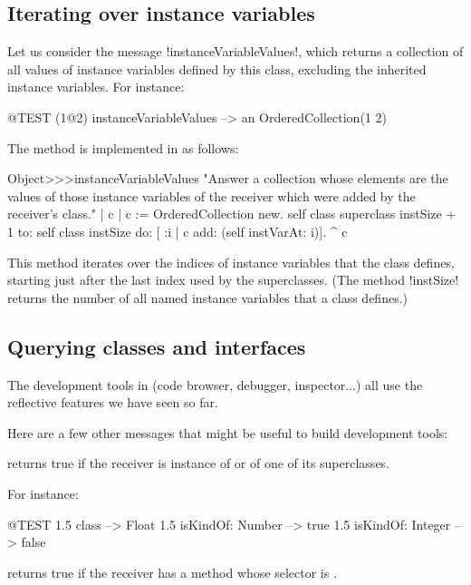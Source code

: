 \documentclass[a4paper,10pt,twoside]{book}
\begin{document}
\subsection{Iterating over instance variables}

Let us consider the message \ct!instanceVariableValues!, which returns a collection of all values of instance variables defined by this class, excluding the inherited instance variables.
For instance:
\begin{code}{@TEST}
(1@2) instanceVariableValues --> an OrderedCollection(1 2)
\end{code}

The method is implemented in  as follows:
\begin{code}{}
Object>>>instanceVariableValues
	"Answer a collection whose elements are the values of those instance variables of the receiver which were added by the receiver's class."	
	| c |
	c := OrderedCollection new.
	self class superclass instSize + 1
		to: self class instSize
		do: [ :i | c add: (self instVarAt: i)].
	^ c
\end{code}

This method iterates over the indices of instance variables that the class defines, starting just after the last index used by the superclasses.
(The method \ct!instSize! returns the number of all named instance variables that a class defines.)

\subsection{Querying classes and interfaces}

The development tools in \pharo (code browser, debugger, inspector...) all use the reflective features we have seen so far.

Here are a few other messages that might be useful to build development tools:

 returns true if the receiver is instance of  or of one of its superclasses.

For instance:
\begin{code}{@TEST}
1.5 class                     --> Float
1.5 isKindOf: Number --> true
1.5 isKindOf: Integer   --> false
\end{code}

 returns true if the receiver has a method whose selector is .
\end{document}
